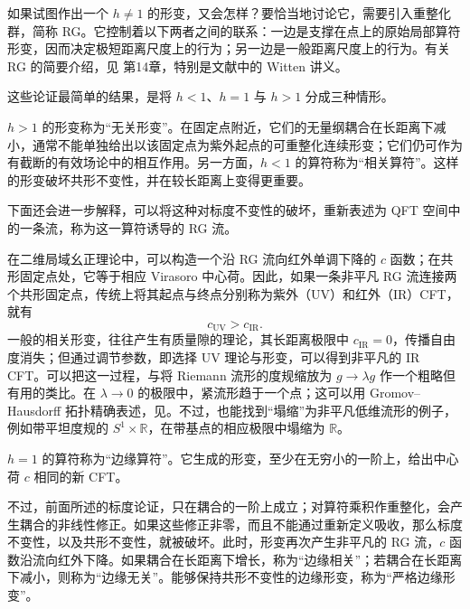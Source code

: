 如果试图作出一个 $h\ne1$ 的形变，又会怎样？要恰当地讨论它，需要引入重整化群，简称 RG。它控制着以下两者之间的联系：一边是支撑在点上的原始局部算符形变，因而决定极短距离尺度上的行为；另一边是一般距离尺度上的行为。有关 RG 的简要介绍，见  第14章，特别是文献中的 Witten 讲义。

这些论证最简单的结果，是将 $h<1$、$h=1$ 与 $h>1$ 分成三种情形。
\begin{definition*}\label{def:3.relevant-irrelevant-deformations}
$h>1$ 的形变称为“无关形变”。在固定点附近，它们的无量纲耦合在长距离下减小，通常不能单独给出以该固定点为紫外起点的可重整化连续形变；它们仍可作为有截断的有效场论中的相互作用。另一方面，$h<1$ 的算符称为“相关算符”。这样的形变破坏共形不变性，并在较长距离上变得更重要。
\end{definition*}
下面还会进一步解释，可以将这种对标度不变性的破坏，重新表述为 QFT 空间中的一条流，称为这一算符诱导的 RG 流。

在二维局域幺正理论中，可以构造一个沿 RG 流向红外单调下降的 $c$ 函数；在共形固定点处，它等于相应 Virasoro 中心荷。因此，如果一条非平凡 RG 流连接两个共形固定点，传统上将其起点与终点分别称为紫外（UV）和红外（IR）CFT，就有
\begin{equation}\label{eq:3.73}
c_{\mathrm{UV}}>c_{\mathrm{IR}}.
\end{equation}
一般的相关形变，往往产生有质量隙的理论，其长距离极限中 $c_{\mathrm{IR}}=0$，传播自由度消失；但通过调节参数，即选择 UV 理论与形变，可以得到非平凡的 IR CFT。可以把这一过程，与将 Riemann 流形的度规缩放为 $g\to\lambda g$ 作一个粗略但有用的类比。在 $\lambda\to0$ 的极限中，紧流形趋于一个点；这可以用 Gromov--Hausdorff 拓扑精确表述，见。不过，也能找到“塌缩”为非平凡低维流形的例子，例如带平坦度规的 $S^1\times\mathbb{R}$，在带基点的相应极限中塌缩为 $\mathbb{R}$。

\begin{definition*}\label{def:3.marginal-deformations}
$h=1$ 的算符称为“边缘算符”。它生成的形变，至少在无穷小的一阶上，给出中心荷 $c$ 相同的新 CFT。
\end{definition*}
不过，前面所述的标度论证，只在耦合的一阶上成立；对算符乘积作重整化，会产生耦合的非线性修正。如果这些修正非零，而且不能通过重新定义吸收，那么标度不变性，以及共形不变性，就被破坏。此时，形变再次产生非平凡的 RG 流，$c$ 函数沿流向红外下降。如果耦合在长距离下增长，称为“边缘相关”；若耦合在长距离下减小，则称为“边缘无关”。能够保持共形不变性的边缘形变，称为“严格边缘形变”。

